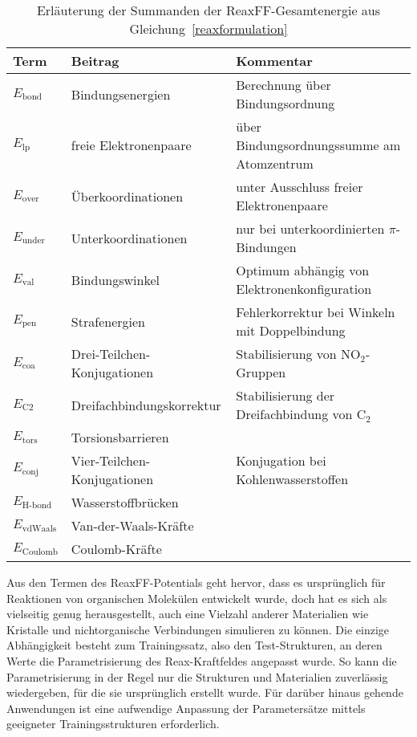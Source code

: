 \begin{table}
  \oddrowcolors
  \caption[Summanden der ReaxFF-Gesamtenergie]{
    Erläuterung der Summanden der ReaxFF-Gesamtenergie aus Gleichung~\ref{reaxformulation}\cite{van_duin_reaxff:_2001}
  }
  \label{tab:reaxenergies}
  \begin{tabularx}{\textwidth}{|llX|}
    \hline
    \textbf{Term}      & \textbf{Beitrag}            & \textbf{Kommentar}                            \\
    \hline
    $E_\text{bond}$    & Bindungsenergien            & Berechnung über Bindungsordnung               \\
    $E_\text{lp}$      & freie Elektronenpaare       & über Bindungsordnungssumme am Atomzentrum     \\
    $E_\text{over}$    & Überkoordinationen          & unter Ausschluss freier Elektronenpaare       \\
    $E_\text{under}$   & Unterkoordinationen         & nur bei unterkoordinierten $\pi$-Bindungen    \\
    $E_\text{val}$     & Bindungswinkel              & Optimum abhängig von Elektronenkonfiguration  \\
    $E_\text{pen}$     & Strafenergien               & Fehlerkorrektur bei Winkeln mit Doppelbindung \\
    $E_\text{coa}$     & Drei-Teilchen-Konjugationen & Stabilisierung von NO$_2$-Gruppen             \\
    $E_\text{C2}$      & Dreifachbindungskorrektur   & Stabilisierung der Dreifachbindung von C$_2$  \\
    $E_\text{tors}$    & Torsionsbarrieren           &                                               \\
    $E_\text{conj}$    & Vier-Teilchen-Konjugationen & Konjugation bei Kohlenwasserstoffen           \\
    $E_\text{H-bond}$  & Wasserstoffbrücken          &                                               \\
    $E_\text{vdWaals}$ & Van-der-Waals-Kräfte        &                                               \\
    $E_\text{Coulomb}$ & Coulomb-Kräfte              &                                               \\
    \hline
  \end{tabularx}
\end{table}

Aus den Termen des ReaxFF-Potentials geht hervor, dass es ursprünglich für Reaktionen von organischen Molekülen entwickelt wurde, doch hat es sich als vielseitig genug herausgestellt, auch eine Vielzahl anderer Materialien wie Kristalle und nichtorganische Verbindungen simulieren zu können.
Die einzige Abhängigkeit besteht zum Trainingssatz, also den Test-Strukturen, an deren Werte die Parametrisierung des Reax-Kraftfeldes angepasst wurde.
So kann die Parametrisierung in der Regel nur die Strukturen und Materialien zuverlässig wiedergeben, für die sie ursprünglich erstellt wurde.
Für darüber hinaus gehende Anwendungen ist eine aufwendige Anpassung der Parametersätze mittels geeigneter Trainingsstrukturen erforderlich.

